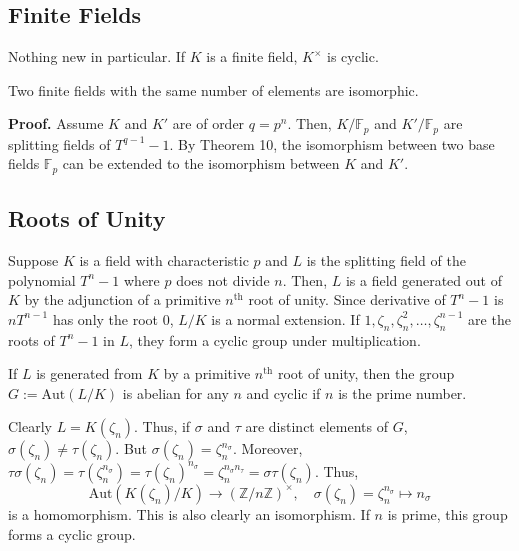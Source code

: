 \documentclass{template}
\begin{document}
\subsection{Finite Fields}

Nothing new in particular. If $K$ is a finite field, 
$K^{\times}$ is cyclic. 

\begin{theorem}
    Two finite fields with the same number of elements are isomorphic.
\end{theorem}

\textbf{Proof.} Assume $K$ and $K'$ are of order $q=p^n$. Then, $K/\mathbb{F}_p$
and $K'/\mathbb{F}_p$ are splitting fields of $T^{q-1}-1$. By Theorem 10, the
isomorphism between two base fields $\mathbb{F}_p$ can be extended to the
isomorphism between $K$ and $K'$.

\subsection{Roots of Unity}

Suppose $K$ is a field with characteristic $p$ and $L$ is the splitting field of
the polynomial $T^n-1$ where $p$ does not divide $n$. Then, $L$ is a field
generated out of $K$ by the adjunction of a primitive $n^{\text{th}}$ root of
unity. Since derivative of $T^n-1$ is $nT^{n-1}$ has only the root $0$, $L/K$ is
a normal extension. If $1,\zeta_n,\zeta_n^2,\dots,\zeta_n^{n-1}$ are the roots of
$T^n-1$ in $L$, they form a cyclic group under multiplication. 

\begin{theorem}
    If $L$ is generated from $K$ by a primitive $n^{\text{th}}$ root of unity,
    then the group $G := \text{Aut}(L/K)$ is abelian for any $n$ and cyclic if $n$ is
    the prime number.
\end{theorem}

Clearly $L=K(\zeta_n)$. Thus, if $\sigma$ and $\tau$ are distinct elements of
$G$, $\sigma(\zeta_n) \neq \tau(\zeta_n)$. But $\sigma(\zeta_n) =
\zeta_n^{n_{\sigma}}$. Moreover, $\tau\sigma(\zeta_n) =
\tau(\zeta_n^{n_{\sigma}})=\tau(\zeta_n)^{n_{\sigma}}=\zeta_n^{n_{\sigma}n_{\tau}}
= \sigma\tau(\zeta_n)$. Thus,
\begin{equation*}
    \text{Aut}(K(\zeta_n)/K) \to (\mathbb{Z}/n\mathbb{Z})^{\times}, \quad \sigma(\zeta_n) = \zeta_n^{n_{\sigma}} \mapsto n_{\sigma}
\end{equation*}
is a homomorphism. This is also clearly an isomorphism. If $n$ is prime, this
group forms a cyclic group.
\end{document}
